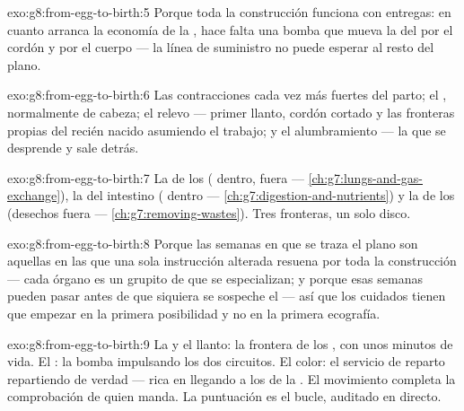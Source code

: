\begin{solution}{exo:g8:from-egg-to-birth:5}
Porque toda la construcción funciona con entregas: en cuanto arranca la
economía de la , hace falta una bomba que mueva la  del
 por el cordón y por el cuerpo --- la línea de suministro no
puede esperar al resto del plano.
\end{solution}

\begin{solution}{exo:g8:from-egg-to-birth:6}
Las contracciones cada vez más fuertes del parto; el ,
normalmente de cabeza; el relevo --- primer llanto, cordón cortado y
las fronteras propias del recién nacido asumiendo el trabajo; y el
alumbramiento --- la  que se desprende y sale detrás.
\end{solution}

\begin{solution}{exo:g8:from-egg-to-birth:7}
La de los  ( dentro,  fuera ---
\cref{ch:g7:lungs-and-gas-exchange}), la del intestino (
dentro --- \cref{ch:g7:digestion-and-nutrients}) y la de los 
(desechos fuera --- \cref{ch:g7:removing-wastes}). Tres fronteras, un
solo disco.
\end{solution}

\begin{solution}{exo:g8:from-egg-to-birth:8}
Porque las semanas en que se traza el plano son aquellas en las que una
sola instrucción alterada resuena por toda la construcción --- cada
órgano es un grupito de  que se especializan; y porque esas
semanas pueden pasar antes de que siquiera se sospeche el  ---
así que los cuidados tienen que empezar en la primera posibilidad y no
en la primera ecografía.
\end{solution}

\begin{solution}{exo:g8:from-egg-to-birth:9}
La  y el llanto: la frontera de los , con unos
minutos de vida. El : la bomba impulsando los dos circuitos. El
color: el servicio de reparto repartiendo de verdad ---  rica en
 llegando a los  de la . El movimiento completa la
comprobación de quien manda. La puntuación es el bucle, auditado en
directo.
\end{solution}

